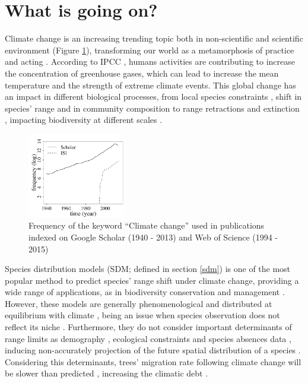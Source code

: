 \section{What is going on?}

Climate change is an increasing trending topic both in non-scientific \citep{Capstick2015} and scientific environment (Figure \ref{fig:fig1}), transforming our world as a metamorphosis of practice and acting \citep{Beck2016}.
According to IPCC \citep{Cubasch2013}, humans activities are contributing to increase the concentration of greenhouse gases, which can lead to increase the mean temperature and the strength of extreme climate events.
This global change has an impact in different biological processes, from local species constraints \citep[e.g. low regeneration][]{Treyger2011}, shift in species' range \citep{Boisvert-Marsh2014,Monleon2015} and in community composition \citep{Dieleman2015} to range retractions and extinction \citep{Thomas2006}, impacting biodiversity at different scales \citep{Penuelas2013}.

\begin{figure}
    \centering
    \includegraphics[width=0.38\textwidth]{img/fig1_em.pdf}
    \caption{Frequency of the keyword ``Climate change'' used in publications indexed on Google Scholar (1940 - 2013) and Web of Science (1994 - 2015)}
    \label{fig:fig1}
\end{figure}

Species distribution models (SDM; defined in section \ref{sdm}) is one of the most popular method to predict species' range shift under climate change, providing a wide range of applications, as in biodiversity conservation and management \citep{Guisan2005,Guisan2013}.
However, these models are generally phenomenological and  distributed at equilibrium with climate \citep[e.g.][]{Pigot2013}, being an issue when species observation does not reflect its niche \citep{Schurr2012}.
Furthermore, they do not consider important determinants of range limits as demography \citep{Louthan2015}, ecological constraints \citep{Wisz2013,Pigot2013} and species absences data \citep{Koshkina2017}, inducing non-accurately projection of the future spatial distribution of a species \citep{Tavecchia2016}.
Considering this determinants, trees' migration rate following climate change will be slower than predicted \citep{Bertrand2011,Sittaro2017}, increasing the climatic debt \citep{Bertrand2016}.

